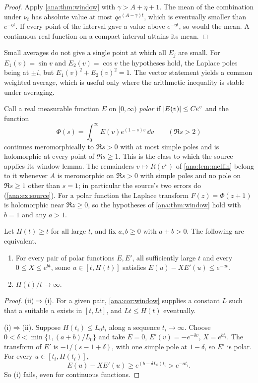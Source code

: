 \begin{proof}
Apply \cref{ana:thm:window} with $\gamma>A+\eta+1$. The mean of the combination under $\nu_t$
has absolute value at most $qe^{(A-\gamma)t}$, which is eventually smaller than $e^{-\eta t}$.
If every point of the interval gave a value above $e^{-\eta t}$, so would the mean. A continuous
real function on a compact interval attains its mean.
\end{proof}

\begin{remark}\label{ana:rem:nocommon}
Small averages do not give a single point at which all $E_j$ are small. For $E_1(v)=\sin v$ and
$E_2(v)=\cos v$ the hypotheses hold, the Laplace poles being at $\pm i$, but
$E_1(v)^2+E_2(v)^2=1$. The vector statement yields a common weighted average, which is useful
only where the arithmetic inequality is stable under averaging.
\end{remark}

Call a real measurable function $E$ on $[0,\infty)$ \emph{polar} if $\lvert E(v)\rvert\le Ce^v$ and
the function
\[
 \Phi(s)=\int_0^\infty E(v)e^{(1-s)v}\,\dd v\qquad(\Re s>2)
\]
continues meromorphically to $\Re s>0$ with at most simple poles and is holomorphic at every
point of $\Re s\ge1$. This
is the class to which the source applies its window lemma. The remainders $v\mapsto R(e^v)$ of
\cref{ana:lem:mellin} belong to it whenever $A$ is meromorphic on $\Re s>0$ with simple poles
and no pole on $\Re s\ge1$ other than $s=1$; in particular the source's two errors do
(\cref{ana:ex:source}). For a polar function the Laplace transform $F(z)=\Phi(z+1)$ is
holomorphic near $\Re z\ge0$, so the hypotheses of \cref{ana:thm:window} hold with $b=1$ and
any $a>1$.

\begin{theorem}\label{ana:thm:schedule}
Let $H(t)\ge t$ for all large $t$, and fix $a,b\ge0$ with $a+b>0$. The following are
equivalent.
\begin{enumerate}[label=\textup{(\roman*)}]
\item For every pair of polar functions $E,E'$, all sufficiently large $t$ and every
 $0\le X\le e^{bt}$, some $u\in[t,H(t)]$ satisfies $E(u)-XE'(u)\le e^{-at}$.
\item $H(t)/t\to\infty$.
\end{enumerate}
\end{theorem}

\begin{proof}
(ii)$\Rightarrow$(i). For a given pair, \cref{ana:cor:window} supplies a constant $L$ such
that a suitable $u$ exists in $[t,Lt]$, and $Lt\le H(t)$ eventually.

(i)$\Rightarrow$(ii). Suppose $H(t_i)\le L_0t_i$ along a sequence $t_i\to\infty$. Choose
$0<\delta<\min\{1,(a+b)/L_0\}$ and take $E=0$, $E'(v)=-e^{-\delta v}$, $X=e^{bt_i}$. The
transform of $E'$ is $-1/(s-1+\delta)$, with one simple pole at $1-\delta$, so $E'$ is polar.
For every $u\in[t_i,H(t_i)]$,
\[
 E(u)-XE'(u)\ge e^{(b-\delta L_0)t_i}>e^{-at_i}.
\]
So (i) fails, even for continuous functions.
\end{proof}

